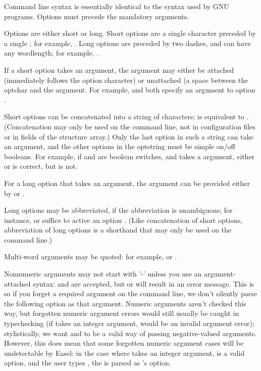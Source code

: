 Command line syntax is essentially identical to the syntax used by GNU
programs. Options must precede the mandatory arguments.

Options are either short or long. Short options are a single character
preceded by a single \ccode{-}; for example, . Long options
are preceded by two dashes, and can have any wordlength; for example,
.

If a short option takes an argument, the argument may either be
attached (immediately follows the option character) or unattached (a
space between the optchar and the argument. For example, 
and  both specify an argument  to option
.

Short options can be concatenated into a string of characters;
 is equivalent to . (Concatenation may
only be used on the command line, not in configuration files or in
fields of the  structure array.) Only the last
option in such a string can take an argument, and the other options in
the optstring must be simple on/off booleans. For example, if
 and  are boolean switches, and  takes a
 argument, either  or 
is correct, but  is not.

For a long option that takes an argument, the argument can be provided
either by  or .

Long options may be abbreviated, if the abbreviation is unambiguous;
for instance,  or  suffice to active an
option . (Like concatenation of short options,
abbreviation of long options is a shorthand that may only be used on
the command line.)

Multi-word arguments may be quoted: for example,  or .

Nonnumeric arguments may not start with '-' unless you use an
argument-attached syntax:  and 
are accepted, but  or  will result
in an error message. This is so if you forget a required argument on
the command line, we don't silently parse the following option as that
argument. Numeric arguments aren't checked this way, but forgotten
numeric argument errors would still usually be caught in typechecking
(if  takes an integer argument,  would be an
invalid argument error); stylistically, we want  and
 to be a valid way of passing negative-valued
arguments.  However, this does mean that some forgotten numeric
argument cases will be undetectable by Easel: in the case where
 takes an integer argument,  is a valid option,
and the user types , the  is parsed as
's option.

